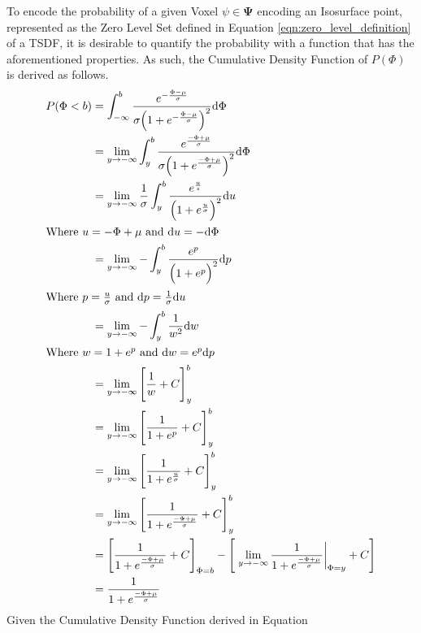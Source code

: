 To encode the probability of a given Voxel $\psi \in \mathbf{\Psi}$ encoding an
Isosurface point, represented as the Zero Level Set defined in Equation
\ref{eqn:zero_level_definition} of a TSDF, it is desirable to quantify the
probability with a function that has the aforementioned properties. As such, the
Cumulative Density Function of $P(\Phi)$ is derived as follows.
\begin{align}
  \label{eqn:probobj_surface_prior_cdf}
  P(\Phi < b) &= \int_{-\infty}^{b} \frac
  {e^{-\frac{\Phi - \mu}{\sigma}}}
  {\sigma \Big( 1 + e^{-\frac{\Phi - \mu}{\sigma}} \Big)^{2}} {\mathrm d{\Phi}}\\
  &= \lim_{y\to -\infty} \int_{y}^{b} \frac
  {e^{\frac{-\Phi + \mu}{\sigma}}}
  {\sigma \Big( 1 + e^{\frac{-\Phi + \mu}{\sigma}} \Big)^{2}} {\mathrm d{\Phi}}\\
  &= \lim_{y\to -\infty} \frac{1}{\sigma} \int_{y}^{b}
  \frac{e^{\frac{u}{s}}}{\Big( 1 + e^{\frac{u}{\sigma}} \Big)^{2}} {\mathrm d{u}}\\
  \shortintertext{Where $u = -\Phi + \mu$ and ${\mathrm d{u}} = -{\mathrm d{\Phi}}$}
  &= \lim_{y\to -\infty} -\int_{y}^{b}
  \frac{e^{p}}{\Big( 1 + e^{p} \Big)^{2}} {\mathrm d{p}}\\
  \shortintertext{Where $p = \frac{u}{\sigma}$ and ${\mathrm d{p}} = \frac{1}{\sigma}
  {\mathrm d{u}}$}
  &= \lim_{y\to -\infty} -\int_{y}^{b} \frac{1}{w^{2}} {\mathrm d{w}}\\
  \shortintertext{Where $w = 1 + e^{p}$ and ${\mathrm d{w}} = e^{p} {\mathrm d{p}}$}
  &= \lim_{y\to -\infty} \Bigg[ \frac{1}{w} + C \Bigg]_{y}^{b}\\
  &= \lim_{y\to -\infty} \Bigg[ \frac{1}{1 + e^{p}} + C \Bigg]_{y}^{b}\\
  &= \lim_{y\to -\infty} \Bigg[ \frac{1}{1 +e^{\frac{u}{\sigma}}} + C
  \Bigg]_{y}^{b}\\
  &= \lim_{y\to -\infty} \Bigg[ \frac{1}{1 + e^{\frac{-\Phi + \mu}{\sigma}}} +
  C \Bigg]_{y}^{b}\\
  &= \Bigg[ \frac{1}{1 + e^{\frac{-\Phi + \mu}{\sigma}}} + C \Bigg]_{\Phi = b}
  - \Bigg[ \left. \lim_{y\to -\infty} \frac{1}{1 + e^{\frac{-\Phi + \mu}{\sigma}}}
  \right\rvert_{\Phi = y} + C \Bigg]\\
  &= \frac{1}{1 + e^{\frac{-\Phi + \mu}{\sigma}}}
\end{align}
Given the Cumulative Density Function derived in Equation
